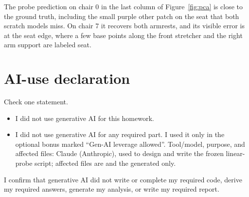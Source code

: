 \documentclass[11pt]{article}
\begin{document}
The probe prediction on chair 0 in the last column of Figure~\ref{fig:pca} is close to the ground truth, including the small purple other patch on the seat that both scratch models miss. On chair 7 it recovers both armrests, and its visible error is at the seat edge, where a few base points along the front stretcher and the right arm support are labeled seat.

\section*{AI-use declaration}
Check one statement.

\begin{itemize}
  \item[$\square$] I did not use generative AI for this homework.
  \item[$\boxtimes$] I did not use generative AI for any required part. I used it
  only in the optional bonus marked ``Gen-AI leverage allowed''. Tool/model,
  purpose, and affected files: Claude (Anthropic), used to design and write the
  frozen linear-probe script; affected files are  and the
  generated  only.
\end{itemize}

I confirm that generative AI did not write or complete my required code,
derive my required answers, generate my analysis, or write my required report.
\end{document}

